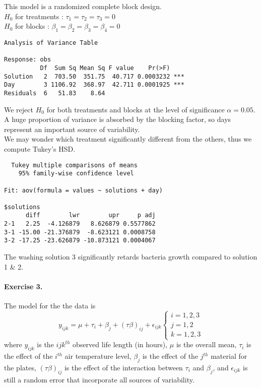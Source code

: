 \documentclass{article}
\begin{document}
This model is a randomized complete block design. \\
$H_0$ for treatments : $ \tau_1 = \tau_2 = \tau_3 =0$\\
$H_0$ for blocks : $ \beta_1 = \beta_2 = \beta_3 =\beta_4=0$
\begin{verbatim}
Analysis of Variance Table

Response: obs
          Df  Sum Sq Mean Sq F value    Pr(>F)    
Solution   2  703.50  351.75  40.717 0.0003232 ***
Day        3 1106.92  368.97  42.711 0.0001925 ***
Residuals  6   51.83    8.64  
\end{verbatim}
We reject $H_0$ for both treatments and blocks at the level of significance $\alpha=0.05$. A huge proportion of variance is absorbed by the blocking factor, so days represent an important source of variability.\\
We may wonder which treatment significantly different from the others, thus we compute Tukey's HSD.
\begin{verbatim}
  Tukey multiple comparisons of means
    95% family-wise confidence level

Fit: aov(formula = values ~ solutions + day)

$solutions
      diff        lwr        upr     p adj
2-1   2.25  -4.126879   8.626879 0.5577862
3-1 -15.00 -21.376879  -8.623121 0.0008758
3-2 -17.25 -23.626879 -10.873121 0.0004067 
\end{verbatim}
The washing solution 3 significantly retards bacteria growth compared to solution 1 \& 2.
\paragraph{Exercise 3.}
The model for the the data is $$
y_{ijk}=\mu +\tau_i+\beta_j +(\tau\beta)_{ij}+\epsilon_{ijk} \left \{
    \begin{array}{ll}
        i=1,2,3 \\
		j=1,2\\
		k=1,2,3
    \end{array}
\right.
$$
where $y_{ijk}$ is the $ijk^{th}$ observed life length (in hours), $\mu$ is the overall mean, $\tau_i$ is the effect of the $i^{th}$ air temperature level, $\beta_j$ is the effect of the $j^{th}$ material for the plates, $(\tau\beta)_{ij}$ is the effect of the interaction between $\tau_i$ and $\beta_j$, and $\epsilon_{ijk}$ is still a random error that incorporate all sources of variability.\\
\end{document}
